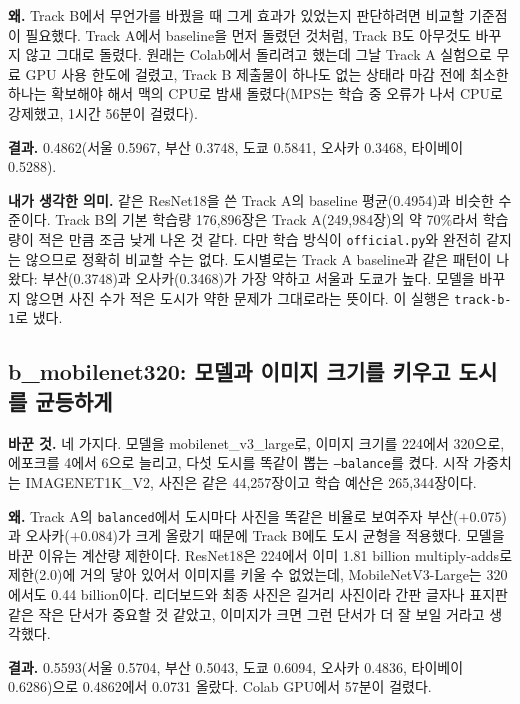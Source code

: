 \documentclass[11pt]{article}
\begin{document}
\textbf{왜.} Track B에서 무언가를 바꿨을 때 그게 효과가 있었는지 판단하려면 비교할
기준점이 필요했다. Track A에서 baseline을 먼저 돌렸던 것처럼, Track B도 아무것도 바꾸지
않고 그대로 돌렸다. 원래는 Colab에서 돌리려고 했는데 그날 Track A 실험으로 무료 GPU 사용
한도에 걸렸고, Track B 제출물이 하나도 없는 상태라 마감 전에 최소한 하나는 확보해야 해서
맥의 CPU로 밤새 돌렸다(MPS는 학습 중 오류가 나서 CPU로 강제했고, 1시간 56분이 걸렸다).

\textbf{결과.} 0.4862(서울 0.5967, 부산 0.3748, 도쿄 0.5841, 오사카 0.3468, 타이베이 0.5288).

\textbf{내가 생각한 의미.} 같은 ResNet18을 쓴 Track A의 baseline 평균(0.4954)과 비슷한
수준이다. Track B의 기본 학습량 176,896장은 Track A(249,984장)의 약 70\%라서 학습량이
적은 만큼 조금 낮게 나온 것 같다. 다만 학습 방식이 \texttt{official.py}와 완전히 같지는
않으므로 정확히 비교할 수는 없다. 도시별로는 Track A baseline과 같은 패턴이 나왔다:
부산(0.3748)과 오사카(0.3468)가 가장 약하고 서울과 도쿄가 높다. 모델을 바꾸지 않으면 사진
수가 적은 도시가 약한 문제가 그대로라는 뜻이다. 이 실행은 \texttt{track-b-1}로 냈다.

\subsection*{b\_mobilenet320: 모델과 이미지 크기를 키우고 도시를 균등하게}

\textbf{바꾼 것.} 네 가지다. 모델을 mobilenet\_v3\_large로, 이미지 크기를 224에서 320으로,
에포크를 4에서 6으로 늘리고, 다섯 도시를 똑같이 뽑는 \texttt{--balance}를 켰다. 시작
가중치는 IMAGENET1K\_V2, 사진은 같은 44,257장이고 학습 예산은 265,344장이다.

\textbf{왜.} Track A의 \texttt{balanced}에서 도시마다 사진을 똑같은 비율로 보여주자
부산($+0.075$)과 오사카($+0.084$)가 크게 올랐기 때문에 Track B에도 도시 균형을 적용했다.
모델을 바꾼 이유는 계산량 제한이다. ResNet18은 224에서 이미 1.81 billion multiply-adds로
제한(2.0)에 거의 닿아 있어서 이미지를 키울 수 없었는데, MobileNetV3-Large는 320에서도
0.44 billion이다. 리더보드와 최종 사진은 길거리 사진이라 간판 글자나 표지판 같은 작은
단서가 중요할 것 같았고, 이미지가 크면 그런 단서가 더 잘 보일 거라고 생각했다.

\textbf{결과.} 0.5593(서울 0.5704, 부산 0.5043, 도쿄 0.6094, 오사카 0.4836, 타이베이
0.6286)으로 0.4862에서 0.0731 올랐다. Colab GPU에서 57분이 걸렸다.
\end{document}
